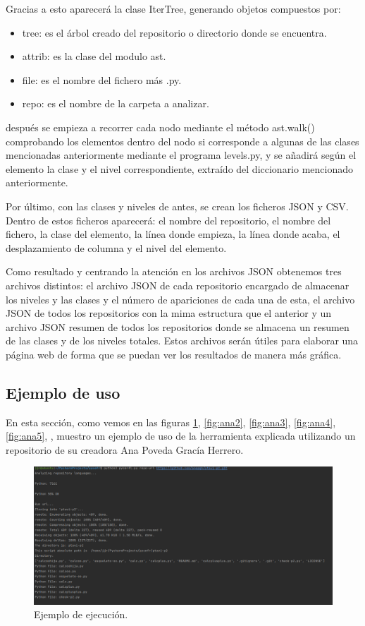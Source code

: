\documentclass[a4paper, 12pt]{book}
\begin{document}
Gracias a esto aparecerá la clase IterTree, generando objetos compuestos por:

\begin{itemize}
	\item tree: es el árbol creado del repositorio o directorio donde se encuentra.
	\item attrib: es la clase del modulo ast.
	\item file: es el nombre del fichero más .py.
	\item repo: es el nombre de la carpeta a analizar.
\end{itemize}

después se empieza a recorrer cada nodo mediante el método ast.walk() comprobando los elementos dentro del nodo si corresponde a algunas de las clases mencionadas anteriormente mediante el programa levels.py, y se añadirá según el elemento la clase y el nivel correspondiente, extraído del diccionario mencionado anteriormente.

Por último, con las clases y niveles de antes, se crean los ficheros JSON y CSV. Dentro de estos ficheros aparecerá: el nombre del repositorio, el nombre del fichero, la clase del elemento, la línea donde empieza, la línea donde acaba, el desplazamiento de columna y el nivel del elemento.

Como resultado y centrando la atención en los archivos JSON obtenemos tres archivos distintos: el archivo JSON de cada repositorio encargado de almacenar los niveles y las clases y el número de apariciones de cada una de esta, el archivo JSON de todos los repositorios con la mima estructura que el anterior y un archivo JSON resumen de todos los repositorios donde se almacena un resumen de las clases y de los niveles totales. Estos archivos serán útiles para elaborar una página web de forma que se puedan ver los resultados de manera más gráfica.

\subsection{Ejemplo de uso}

En esta sección, como vemos en las figuras \ref{fig:ana1}, \ref{fig:ana2}, \ref{fig:ana3}, \ref{fig:ana4}, \ref{fig:ana5},  , muestro un ejemplo de uso de la herramienta explicada utilizando un repositorio de su creadora Ana Poveda Gracía Herrero.

\begin{figure}
  \centering
  \includegraphics[width=1\textwidth]{img/ejemplousoana1.png}
  \caption{Ejemplo de ejecución.}\label{fig:ana1}
\end{figure}
\end{document}

